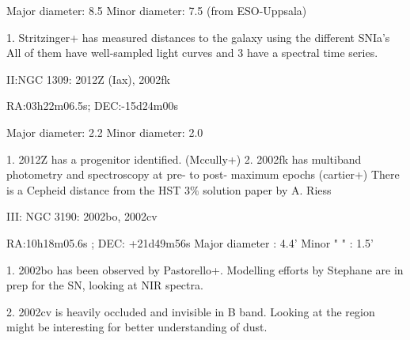 \documentclass{article}
\begin{document}
Major diameter:	8.5
Minor diameter:	7.5 (from ESO-Uppsala)

1. Stritzinger+ has measured distances to the galaxy using the different SNIa's 
All of them have well-sampled light curves and 3 have a spectral time series.



II:NGC 1309: 2012Z (Iax), 2002fk

RA:03h22m06.5s; DEC:-15d24m00s


Major diameter:	2.2
Minor diameter:	2.0

1. 2012Z has a progenitor identified. (Mccully+)
2. 2002fk has multiband photometry and spectroscopy at pre- to post- maximum epochs
(cartier+)
There is a Cepheid distance from the HST $3\%$ solution paper by A. Riess


III: NGC 3190: 2002bo, 2002cv

RA:10h18m05.6s	; DEC: +21d49m56s
Major diameter : 4.4'
Minor  " "    : 1.5'

1. 2002bo has been observed by Pastorello+. Modelling efforts by Stephane are in prep for the SN, looking at NIR spectra.

2. 2002cv is heavily occluded and invisible in B band. Looking at the region might be interesting for better understanding of dust.
\end{document}

